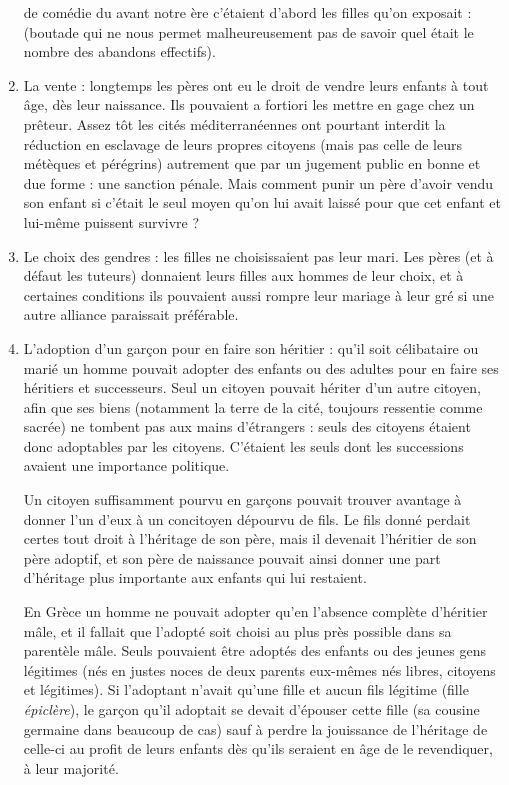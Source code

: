 \begin{enumerate}
de comédie du  avant notre ère c'étaient d'abord les filles
qu'on exposait :  (boutade qui ne nous permet malheureusement pas
de savoir quel était le nombre des abandons effectifs).
\item La vente : longtemps les pères ont eu le droit de vendre leurs
enfants à tout âge, dès leur naissance. Ils pouvaient a fortiori les mettre
en gage chez un prêteur. Assez tôt les cités méditerranéennes ont pourtant
interdit la réduction en esclavage de leurs propres citoyens (mais pas
celle de leurs métèques et pérégrins) autrement que par un jugement public
en bonne et due forme : une sanction pénale. Mais comment punir
un père d'avoir vendu son enfant si c'était le seul moyen qu'on lui avait
laissé pour que cet enfant et lui-même puissent survivre ?
\item Le choix des gendres : les filles ne choisissaient pas leur mari.
Les pères (et à défaut les tuteurs) donnaient leurs filles aux hommes de
leur choix, et à certaines conditions ils pouvaient aussi rompre leur mariage
à leur gré si une autre alliance paraissait préférable.
\item L'adoption d'un garçon pour en faire son héritier : qu'il soit célibataire
ou marié un homme pouvait adopter des enfants ou des adultes
pour en faire ses héritiers et successeurs. Seul un citoyen pouvait hériter
d'un autre citoyen, afin que ses biens (notamment la terre de la cité, toujours
ressentie comme sacrée) ne tombent pas aux mains d'étrangers :
seuls des citoyens étaient donc adoptables par les citoyens. C'étaient les
seuls dont les successions avaient une importance politique.

Un citoyen suffisamment
pourvu en garçons pouvait trouver avantage à donner l'un d'eux à un concitoyen dépourvu
de fils. Le fils donné perdait certes tout droit à l'héritage de son père, mais il devenait
l'héritier de son père adoptif, et son père de naissance
pouvait ainsi donner une part d'héritage plus importante aux enfants qui
lui restaient.

En Grèce un homme ne pouvait adopter qu'en l'absence complète
d'héritier mâle, et il fallait que l'adopté soit choisi au plus près possible
dans sa parentèle mâle. Seuls pouvaient être adoptés des enfants ou des
jeunes gens légitimes (nés en justes noces de deux parents eux-mêmes
nés libres, citoyens et légitimes). Si l'adoptant n'avait qu'une fille et aucun
fils légitime (fille \emph{épiclère}), le garçon qu'il adoptait se devait d'épouser cette
fille (sa cousine germaine dans beaucoup de cas) sauf à perdre la jouissance
de l'héritage de celle-ci au profit de leurs enfants dès qu'ils seraient
en âge de le revendiquer, à leur majorité.


\end{enumerate}
